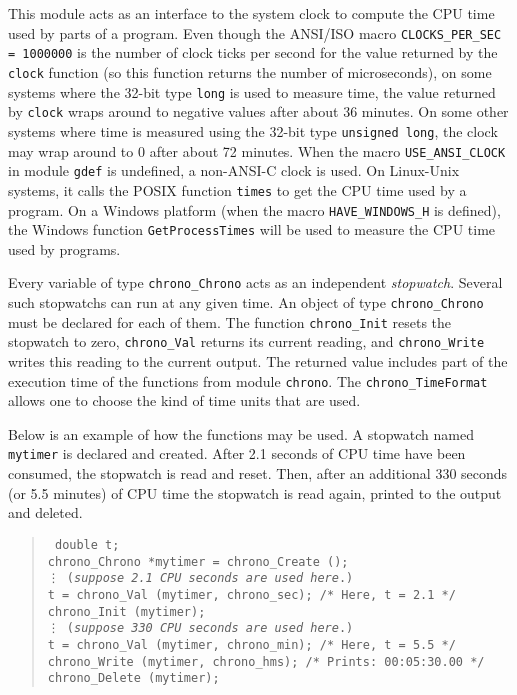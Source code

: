 
This module acts as an interface to the system clock to compute the
CPU time used by parts of a program.
  Even though the ANSI/ISO macro {\tt CLOCKS\_PER\_SEC = 1000000}
  is the number of clock ticks per second for the value
  returned by the {\tt clock} function (so this function returns the
  number of microseconds), on some systems where the 32-bit type {\tt long}
  is used to measure time, the value returned by {\tt clock}
  wraps around to negative values after about 36 minutes.
  On some other systems where time is measured using the 32-bit type
  {\tt unsigned long}, the clock may wrap around to 0 after about
   72 minutes.
  When the macro {\tt USE\_ANSI\_CLOCK} in module {\tt gdef} is undefined,
  a non-ANSI-C clock is used.
  On Linux-Unix systems, it calls the POSIX
  function {\tt times} to get the CPU time used by a program.
  On a Windows platform (when the macro \texttt{HAVE\_WINDOWS\_H} is defined),
  the Windows function \texttt{GetProcessTimes} will be used to measure
  the CPU time used by programs.


Every variable of type {\tt chrono\_Chrono} acts as an independent
{\em stopwatch}.  Several such stopwatchs can run at any given time.
An object of type {\tt chrono\_Chrono} must be declared
for each of them.
The function {\tt chrono\_Init} resets the stopwatch to zero,
{\tt chrono\_Val\/} returns its current reading,
and {\tt chrono\_Write\/} writes this reading to the current output.
The returned value includes part of the execution time of the functions
from module {\tt chrono\/}.
The {\tt chrono\_TimeFormat} allows one to choose the kind of
time units that are used.

Below is an example of how the functions may be used.
A stopwatch named {\tt mytimer} is declared and created.
After 2.1 seconds of CPU time have been consumed, the stopwatch is read and
reset. Then, after an additional 330 seconds (or 5.5 minutes) of CPU time
the stopwatch is read again, printed to the output and deleted.
%
 \begin{verse}{\tt
  double t; \\
  chrono\_Chrono *mytimer = chrono\_Create (); \\
\hskip 1.0cm   \vdots
\hskip 1.0cm  ({\em suppose 2.1 CPU seconds are used here}.)\\[6pt]
  t = chrono\_Val (mytimer, chrono\_sec); \qquad   /* Here, t = 2.1 */ \\
  chrono\_Init (mytimer); \\
\hskip 1.0cm  \vdots
\hskip 1.0cm ({\em suppose 330 CPU seconds are used here}.) \\[10pt]
  t = chrono\_Val (mytimer, chrono\_min); \qquad    /* Here, t = 5.5 */\\
  chrono\_Write (mytimer, chrono\_hms);  \qquad  /* Prints: 00:05:30.00 */\\
  chrono\_Delete (mytimer);
 }\end{verse}

